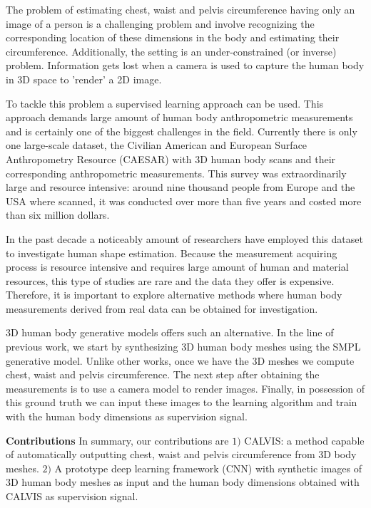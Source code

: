\documentclass[runningheads, orivec]{llncs}
\begin{document}
The problem of estimating chest, waist and 
pelvis circumference having only an image of a person is a challenging problem 
and involve recognizing the corresponding location of these dimensions in the 
body and estimating their circumference. Additionally, the setting is an  
under-constrained  (or inverse) problem. Information 
gets lost when a camera is 
used to capture the human body in 3D space to 'render' a 2D image. 

To tackle this problem a supervised learning approach can be used. This approach
demands large amount of human body anthropometric measurements and is certainly 
one of the biggest challenges in the field.  Currently there 
is only one large-scale dataset, the Civilian American and 
European Surface Anthropometry Resource (CAESAR) \cite{robinette1999caesar} 
with 3D human body scans and their corresponding anthropometric measurements. 
This survey was extraordinarily large and resource intensive: around nine 
thousand people from Europe and the USA where scanned, it was conducted over 
more than five years and costed more than six million dollars.

In the past decade a noticeably amount of researchers have employed this 
dataset to investigate human shape estimation. Because the measurement 
acquiring process is resource intensive and requires large amount of human and 
material resources, this type of studies are rare and the data they offer is 
expensive. Therefore, it is important to explore alternative methods where 
human body measurements derived from real data can be obtained for 
investigation.

3D human body generative models offers such an alternative. In the line of previous work, we start by synthesizing 3D human body meshes using the SMPL \cite{Loper.2015} generative 
model. Unlike other works, once we have 
the 3D meshes we compute chest, waist and pelvis circumference. The next 
step after obtaining the 
measurements is to use a camera model to render
images. Finally, in possession of this ground truth we can 
input these images to the learning algorithm and train with the human body dimensions as supervision signal.

\textbf{Contributions} In summary, our contributions are $1)$ CALVIS: a method 
capable of automatically outputting chest, waist and pelvis circumference from 
3D body meshes. $2)$ A prototype deep learning framework (CNN) with synthetic 
images of 3D human body meshes as input and the human body dimensions obtained 
with CALVIS as supervision signal.
\end{document}
